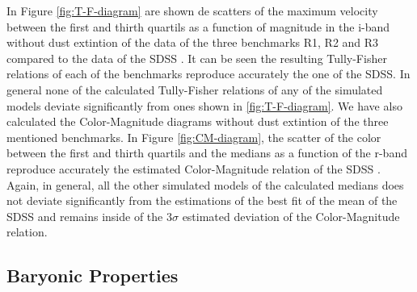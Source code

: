 \documentclass[usenatbib]{mn2e}
\begin{document}
In Figure \ref{fig:T-F-diagram} are shown de scatters of the maximum velocity  between the first and thirth quartils  as a function of magnitude in
 the i-band without dust extintion of the data of the three benchmarks R1, R2 and R3 compared to the data of the SDSS \citep{2007AJ....134..945P}.
 It can be seen the resulting Tully-Fisher relations of each of the benchmarks reproduce accurately the one of the SDSS. In general none of the 
calculated Tully-Fisher relations of any of the simulated models deviate significantly from ones shown in \ref{fig:T-F-diagram}. We have also calculated the
 Color-Magnitude diagrams without dust extintion of the three mentioned benchmarks. In Figure \ref{fig:CM-diagram}, the scatter of the color between the 
first and thirth quartils and the medians as a function of the r-band reproduce accurately the estimated Color-Magnitude relation of the 
SDSS \citep{2012MNRAS.423.1583M}. Again, in general, all the other simulated models of the calculated medians does not deviate significantly from 
the estimations of the best fit of the mean of the SDSS and remains inside of the $3\sigma$ estimated deviation of the Color-Magnitude relation.


\subsection{Baryonic Properties}
\end{document}
